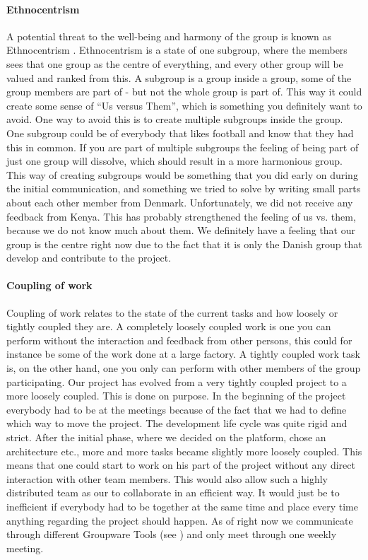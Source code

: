 \paragraph{Ethnocentrism} \label{par:ethnocentrism}
A potential threat to the well-being and harmony of the group is known as Ethnocentrism \cite{durnell2004subgroup}. Ethnocentrism is a state of one subgroup, where the members sees that one group as the centre of everything, and every other group will be valued and ranked from this. A subgroup is a group inside a group, some of the group members are part of - but not the whole group is part of. This way it could create some sense of ``Us versus Them'', which is something you definitely want to avoid. One way to avoid this is to create multiple subgroups inside the group. One subgroup could be of everybody that likes football and know that they had this in common. If you are part of multiple subgroups the feeling of being part of just one group will dissolve, which should result in a more harmonious group.
This way of creating subgroups would be something that you did early on during the initial communication, and something we tried to solve by writing small parts about each other member from Denmark. Unfortunately, we did not receive any feedback from Kenya. This has probably strengthened the feeling of us vs. them, because we do not know much about them. We definitely have a feeling that our group is the centre right now due to the fact that it is only the Danish group that develop and contribute to the project.

\paragraph{Coupling of work} \label{par:couplingofwork}
Coupling of work relates to the state of the current tasks and how loosely or tightly coupled they are. A completely loosely coupled work is one you can perform without the interaction and feedback from other persons, this could for instance be some of the work done at a large factory. A tightly coupled work task is, on the other hand, one you only can perform with other members of the group participating. Our project has evolved from a very tightly coupled project to a more loosely coupled. This is done on purpose. In the beginning of the project everybody had to be at the meetings because of the fact that we had to define which way to move the project. The development life cycle was quite rigid and strict. After the initial phase, where we decided on the platform, chose an architecture etc., more and more tasks became slightly more loosely coupled. This means that one could start to work on his part of the project without any direct interaction with other team members. This would also allow such a highly distributed team as our to collaborate in an efficient way. It would just be to inefficient if everybody had to be together at the same time and place every time anything regarding the project should happen. As of right now we communicate through different Groupware Tools (see ) and only meet through one weekly meeting.

